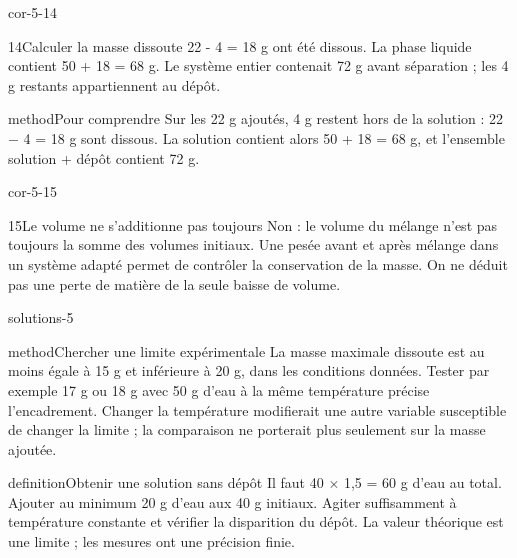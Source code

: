 \documentclass[12pt,twoside,openany]{book}
\begin{document}
\begin{blocLivre}{cor-5-14}
\begin{corrige}{14}{Calculer la masse dissoute}
22 - 4 = 18 g ont été dissous. La phase liquide contient 50 + 18 = 68 g. Le système entier contenait 72 g avant séparation ; les 4 g restants appartiennent au dépôt.\par
\begin{pcEncadre}{method}{Pour comprendre}
Sur les 22 g ajoutés, 4 g restent hors de la solution : 22 − 4 = 18 g sont dissous. La solution contient alors 50 + 18 = 68 g, et l’ensemble solution + dépôt contient 72 g.\par
\end{pcEncadre}
\end{corrige}\end{blocLivre}
\begin{blocLivre}{cor-5-15}
\begin{corrige}{15}{Le volume ne s’additionne pas toujours}
Non : le volume du mélange n’est pas toujours la somme des volumes initiaux. Une pesée avant et après mélange dans un système adapté permet de contrôler la conservation de la masse. On ne déduit pas une perte de matière de la seule baisse de volume.\par
\end{corrige}\end{blocLivre}
\label{solutions-5}
\begin{pcFiche}{solutions-5}
\begin{pcEncadre}{method}{Chercher une limite expérimentale}
La masse maximale dissoute est au moins égale à 15 g et inférieure à 20 g, dans les conditions données. Tester par exemple 17 g ou 18 g avec 50 g d’eau à la même température précise l’encadrement. Changer la température modifierait une autre variable susceptible de changer la limite ; la comparaison ne porterait plus seulement sur la masse ajoutée.\par
\end{pcEncadre}
\label{defi-cor-5}
\begin{pcEncadre}{definition}{Obtenir une solution sans dépôt}
Il faut 40 \(\times\) 1,5 = 60 g d’eau au total. Ajouter au minimum 20 g d’eau aux 40 g initiaux. Agiter suffisamment à température constante et vérifier la disparition du dépôt. La valeur théorique est une limite ; les mesures ont une précision finie.\par
\end{pcEncadre}
\end{pcFiche}
\end{document}
